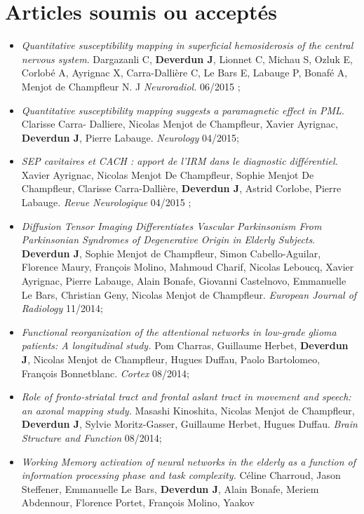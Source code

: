 \section{Articles soumis ou acceptés}
\begin{itemize}
\item {\em Quantitative susceptibility mapping in superficial hemosiderosis of the central nervous system}.
Dargazanli C, {\bf Deverdun J}, Lionnet C, Michau S, Ozluk E, Corlobé A, Ayrignac X, Carra-Dallière
 C, Le Bars E, Labauge P, Bonafé A, Menjot de Champfleur N. J {\em Neuroradiol.} 06/2015 ;
\item {\em Quantitative susceptibility mapping suggests a paramagnetic effect in PML}. Clarisse Carra-
Dalliere, Nicolas Menjot de Champfleur, Xavier Ayrignac, {\bf Deverdun J}, Pierre Labauge.
{\em Neurology} 04/2015;
\item {\em SEP cavitaires et CACH : apport de l’IRM dans le diagnostic différentiel.} Xavier Ayrignac, Nicolas
  Menjot De Champfleur, Sophie Menjot De Champfleur, Clarisse Carra-Dallière, {\bf Deverdun J}, Astrid Corlobe, Pierre Labauge. {\em Revue Neurologique} 04/2015 ;
\item {\em Diffusion Tensor Imaging Differentiates Vascular Parkinsonism From Parkinsonian Syndromes
of Degenerative Origin in Elderly Subjects}. {\bf Deverdun J}, Sophie Menjot de Champfleur,
 Simon Cabello-Aguilar, Florence Maury, François Molino, Mahmoud Charif, Nicolas Leboucq,
 Xavier Ayrignac, Pierre Labauge, Alain Bonafe, Giovanni Castelnovo, Emmanuelle Le Bars,
Christian Geny, Nicolas Menjot de Champfleur. {\em European Journal of Radiology} 11/2014;
\item {\em Functional reorganization of the attentional networks in low-grade glioma patients: A
   longitudinal study.} Pom Charras, Guillaume Herbet, {\bf Deverdun J}, Nicolas Menjot de
    Champfleur, Hugues Duffau, Paolo Bartolomeo, François Bonnetblanc. {\em Cortex} 08/2014;
\item {\em Role of fronto-striatal tract and frontal aslant tract in movement and speech: an axonal
   mapping study.} Masashi Kinoshita, Nicolas Menjot de Champfleur, {\bf Deverdun J}, Sylvie
  Moritz-Gasser, Guillaume Herbet, Hugues Duffau. {\em Brain Structure and Function} 08/2014;
\item {\em Working Memory activation of neural networks in the elderly as a function of information
   processing phase and task complexity.} Céline Charroud, Jason Steffener, Emmanuelle Le Bars,
   {\bf Deverdun J}, Alain Bonafe, Meriem Abdennour, Florence Portet, François Molino, Yaakov

\end{itemize}
